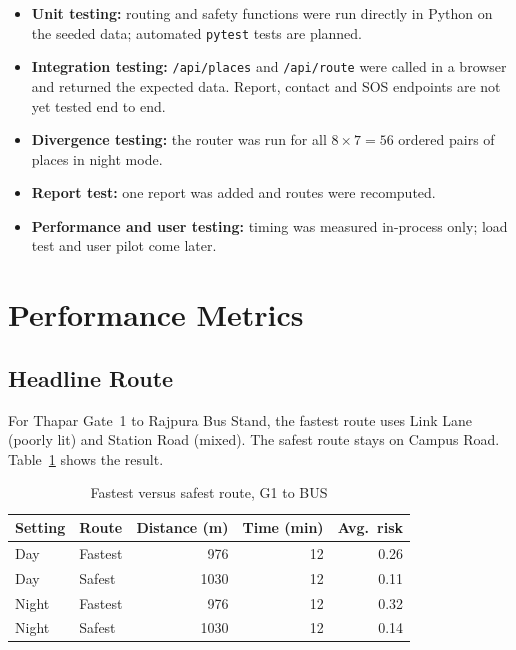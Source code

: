 \documentclass{tietreport}
\begin{document}
\begin{itemize}
  \item \textbf{Unit testing:} routing and safety functions were run
    directly in Python on the seeded data; automated \texttt{pytest}
    tests are planned.
  \item \textbf{Integration testing:} \texttt{/api/places} and
    \texttt{/api/route} were called in a browser and returned the
    expected data. Report, contact and SOS endpoints are not yet tested
    end to end.
  \item \textbf{Divergence testing:} the router was run for all
    $8 \times 7 = 56$ ordered pairs of places in night mode.
  \item \textbf{Report test:} one report was added and routes were
    recomputed.
  \item \textbf{Performance and user testing:} timing was measured
    in-process only; load test and user pilot come later.
\end{itemize}

\section{Performance Metrics}

\subsection{Headline Route}

For Thapar Gate~1 to Rajpura Bus Stand, the fastest route uses Link Lane
(poorly lit) and Station Road (mixed). The safest route stays on Campus
Road. Table~\ref{tab:routes} shows the result.

\begin{table}[h]
\centering
\begin{tabular}{|l|l|r|r|r|}
  \hline
  \textbf{Setting} & \textbf{Route} & \textbf{Distance (m)} &
  \textbf{Time (min)} & \textbf{Avg.\ risk} \\ \hline
  Day   & Fastest & 976  & 12 & 0.26 \\ \hline
  Day   & Safest  & 1030 & 12 & 0.11 \\ \hline
  Night & Fastest & 976  & 12 & 0.32 \\ \hline
  Night & Safest  & 1030 & 12 & 0.14 \\ \hline
\end{tabular}
\caption{Fastest versus safest route, G1 to BUS}
\label{tab:routes}
\end{table}
\end{document}
